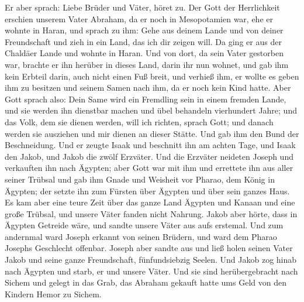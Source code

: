  Er aber sprach: Liebe Brüder und Väter, höret zu. Der
Gott der Herrlichkeit erschien unserem Vater Abraham, da er noch in
Mesopotamien war, ehe er wohnte in Haran,  und sprach zu
ihm: Gehe aus deinem Lande und von deiner Freundschaft und zieh in ein
Land, das ich dir zeigen will.  Da ging er aus der
Chaldäer Lande und wohnte in Haran. Und von dort, da sein Vater
gestorben war, brachte er ihn herüber in dieses Land, darin ihr nun
wohnet,  und gab ihm kein Erbteil darin, auch nicht einen
Fuß breit, und verhieß ihm, er wollte es geben ihm zu besitzen und
seinem Samen nach ihm, da er noch kein Kind hatte.  Aber
Gott sprach also: Dein Same wird ein Fremdling sein in einem fremden
Lande, und sie werden ihn dienstbar machen und übel behandeln
vierhundert Jahre;  und das Volk, dem sie dienen werden,
will ich richten, sprach Gott; und danach werden sie ausziehen und mir
dienen an dieser Stätte.  Und gab ihm den Bund der
Beschneidung. Und er zeugte Isaak und beschnitt ihn am achten Tage, und
Isaak den Jakob, und Jakob die zwölf Erzväter.  Und die
Erzväter neideten Joseph und verkauften ihn nach Ägypten; aber Gott war
mit ihm  und errettete ihn aus aller seiner Trübsal und
gab ihm Gnade und Weisheit vor Pharao, dem König in Ägypten; der setzte
ihn zum Fürsten über Ägypten und über sein ganzes Haus. 
Es kam aber eine teure Zeit über das ganze Land Ägypten und Kanaan und
eine große Trübsal, und unsere Väter fanden nicht Nahrung.
 Jakob aber hörte, dass in Ägypten Getreide wäre, und
sandte unsere Väter aus aufs erstemal.  Und zum andernmal
ward Joseph erkannt von seinen Brüdern, und ward dem Pharao Josephs
Geschlecht offenbar.  Joseph aber sandte aus und ließ
holen seinen Vater Jakob und seine ganze Freundschaft, fünfundsiebzig
Seelen.  Und Jakob zog hinab nach Ägypten und starb, er
und unsere Väter.  Und sie sind herübergebracht nach
Sichem und gelegt in das Grab, das Abraham gekauft hatte ums Geld von
den Kindern Hemor zu Sichem.

